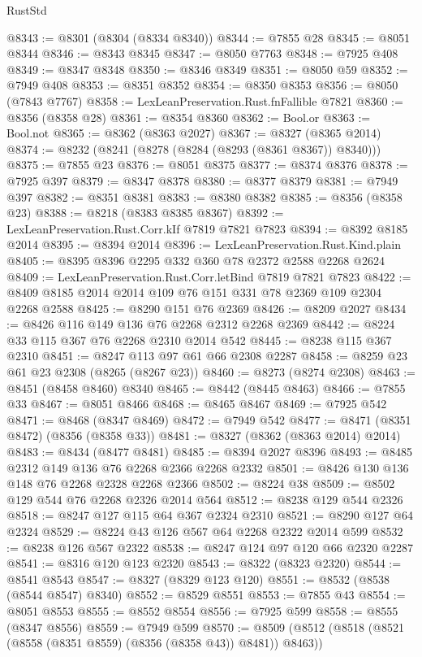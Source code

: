 \begin{lexlean}{RustStd}
\begin{coremodule}
@8343 := @8301 (@8304 (@8334 @8340))
@8344 := @7855 @28
@8345 := @8051 @8344
@8346 := @8343 @8345
@8347 := @8050 @7763
@8348 := @7925 @408
@8349 := @8347 @8348
@8350 := @8346 @8349
@8351 := @8050 @59
@8352 := @7949 @408
@8353 := @8351 @8352
@8354 := @8350 @8353
@8356 := @8050 (@7843 @7767)
@8358 := LexLeanPreservation.Rust.fnFallible @7821
@8360 := @8356 (@8358 @28)
@8361 := @8354 @8360
@8362 := Bool.or
@8363 := Bool.not
@8365 := @8362 (@8363 @2027)
@8367 := @8327 (@8365 @2014)
@8374 := @8232 (@8241 (@8278 (@8284 (@8293 (@8361 @8367)) @8340)))
@8375 := @7855 @23
@8376 := @8051 @8375
@8377 := @8374 @8376
@8378 := @7925 @397
@8379 := @8347 @8378
@8380 := @8377 @8379
@8381 := @7949 @397
@8382 := @8351 @8381
@8383 := @8380 @8382
@8385 := @8356 (@8358 @23)
@8388 := @8218 (@8383 @8385 @8367)
@8392 := LexLeanPreservation.Rust.Corr.kIf @7819 @7821 @7823
@8394 := @8392 @8185 @2014
@8395 := @8394 @2014
@8396 := LexLeanPreservation.Rust.Kind.plain
@8405 := @8395 @8396 @2295 @332 @360 @78 @2372 @2588 @2268 @2624
@8409 := LexLeanPreservation.Rust.Corr.letBind @7819 @7821 @7823
@8422 := @8409 @8185 @2014 @2014 @109 @76 @151 @331 @78 @2369 @109 @2304 @2268 @2588
@8425 := @8290 @151 @76 @2369
@8426 := @8209 @2027
@8434 := @8426 @116 @149 @136 @76 @2268 @2312 @2268 @2369
@8442 := @8224 @33 @115 @367 @76 @2268 @2310 @2014 @542
@8445 := @8238 @115 @367 @2310
@8451 := @8247 @113 @97 @61 @66 @2308 @2287
@8458 := @8259 @23 @61 @23 @2308 (@8265 (@8267 @23))
@8460 := @8273 (@8274 @2308)
@8463 := @8451 (@8458 @8460) @8340
@8465 := @8442 (@8445 @8463)
@8466 := @7855 @33
@8467 := @8051 @8466
@8468 := @8465 @8467
@8469 := @7925 @542
@8471 := @8468 (@8347 @8469)
@8472 := @7949 @542
@8477 := @8471 (@8351 @8472) (@8356 (@8358 @33))
@8481 := @8327 (@8362 (@8363 @2014) @2014)
@8483 := @8434 (@8477 @8481)
@8485 := @8394 @2027 @8396
@8493 := @8485 @2312 @149 @136 @76 @2268 @2366 @2268 @2332
@8501 := @8426 @130 @136 @148 @76 @2268 @2328 @2268 @2366
@8502 := @8224 @38
@8509 := @8502 @129 @544 @76 @2268 @2326 @2014 @564
@8512 := @8238 @129 @544 @2326
@8518 := @8247 @127 @115 @64 @367 @2324 @2310
@8521 := @8290 @127 @64 @2324
@8529 := @8224 @43 @126 @567 @64 @2268 @2322 @2014 @599
@8532 := @8238 @126 @567 @2322
@8538 := @8247 @124 @97 @120 @66 @2320 @2287
@8541 := @8316 @120 @123 @2320
@8543 := @8322 (@8323 @2320)
@8544 := @8541 @8543
@8547 := @8327 (@8329 @123 @120)
@8551 := @8532 (@8538 (@8544 @8547) @8340)
@8552 := @8529 @8551
@8553 := @7855 @43
@8554 := @8051 @8553
@8555 := @8552 @8554
@8556 := @7925 @599
@8558 := @8555 (@8347 @8556)
@8559 := @7949 @599
@8570 := @8509 (@8512 (@8518 (@8521 (@8558 (@8351 @8559) (@8356 (@8358 @43)) @8481)) @8463))

\end{coremodule}
\end{lexlean}
